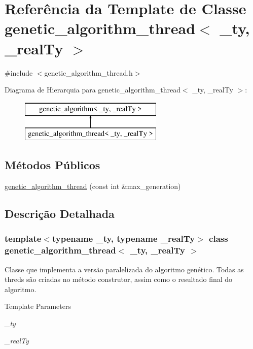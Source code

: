 \hypertarget{classgenetic__algorithm__thread}{
\section{Referência da Template de Classe genetic\_\-algorithm\_\-thread$<$ \_\-ty, \_\-realTy $>$}
\label{classgenetic__algorithm__thread}
}


{\ttfamily \#include $<$genetic\_\-algorithm\_\-thread.h$>$}

Diagrama de Hierarquia para genetic\_\-algorithm\_\-thread$<$ \_\-ty, \_\-realTy $>$:\begin{figure}[H]
\begin{center}
\leavevmode
\includegraphics[height=2cm]{classgenetic__algorithm__thread}
\end{center}
\end{figure}
\subsection*{Métodos Públicos}
\begin{DoxyCompactItemize}
\item 
\hyperlink{classgenetic__algorithm__thread_aa09321fa64467ad8dbe34d809eb786da}{genetic\_\-algorithm\_\-thread} (const int \&max\_\-generation)
\end{DoxyCompactItemize}


\subsection{Descrição Detalhada}
\subsubsection*{template$<$typename \_\-ty, typename \_\-realTy$>$ class genetic\_\-algorithm\_\-thread$<$ \_\-ty, \_\-realTy $>$}

Classe que implementa a versão paralelizada do algoritmo genético. Todas as threds são criadas no método construtor, assim como o resultado final do algoritmo.


\begin{DoxyTemplParams}{Template Parameters}
\item[{\em \_\-ty}]\item[{\em \_\-realTy}]\end{DoxyTemplParams}


